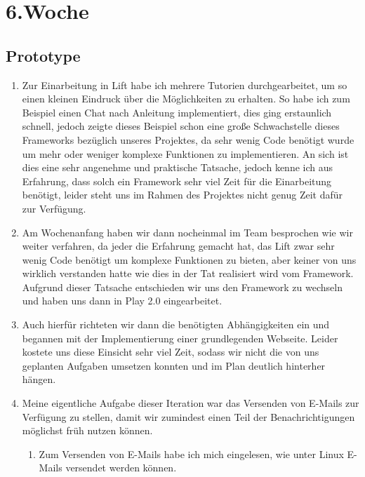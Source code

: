 \chapter{6.\hspace{0.5em}Woche}\label{wo6}

\section{Prototype}\label{wo6_1}

\begin{enumerate}[label={\Roman*)}]
	\item Zur Einarbeitung in Lift habe ich mehrere Tutorien durchgearbeitet, um so einen kleinen Eindruck \"uber die
M\"oglichkeiten zu erhalten. So habe ich zum Beispiel einen Chat nach Anleitung implementiert, dies ging erstaunlich schnell,
jedoch zeigte dieses Beispiel schon eine gro\ss{}e Schwachstelle dieses Frameworks bez\"uglich unseres Projektes, da sehr wenig
Code ben\"otigt wurde um mehr oder weniger komplexe Funktionen zu implementieren. An sich ist dies eine sehr angenehme und
praktische Tatsache, jedoch kenne ich aus Erfahrung, dass solch ein Framework sehr viel Zeit f\"ur die Einarbeitung ben\"otigt,
leider steht uns im Rahmen des Projektes nicht genug Zeit daf\"ur zur Verf\"ugung.
	\item Am Wochenanfang haben wir dann nocheinmal im Team besprochen wie wir weiter verfahren, da jeder die Erfahrung
gemacht hat, das Lift zwar sehr wenig Code ben\"otigt um komplexe Funktionen zu bieten, aber keiner von uns wirklich verstanden
hatte wie dies in der Tat realisiert wird vom Framework. Aufgrund dieser Tatsache entschieden wir uns den Framework zu wechseln
und haben uns dann in Play 2.0 eingearbeitet.
	\item Auch hierf\"ur richteten wir dann die ben\"otigten Abh\"angigkeiten ein und begannen mit der Implementierung einer
grundlegenden Webseite. Leider kostete uns diese Einsicht sehr viel Zeit, sodass wir nicht die von uns geplanten Aufgaben
umsetzen konnten und im Plan deutlich hinterher h\"angen.
	\item Meine eigentliche Aufgabe dieser Iteration war das Versenden von E-Mails zur Verf\"ugung zu stellen, damit wir
zumindest einen Teil der Benachrichtigungen m\"oglichst fr\"uh nutzen k\"onnen.
	\begin{enumerate}[label={\arabic*}]
		\item Zum Versenden von E-Mails habe ich mich eingelesen, wie unter Linux E-Mails versendet werden k\"onnen.

\end{enumerate}
\end{enumerate}
